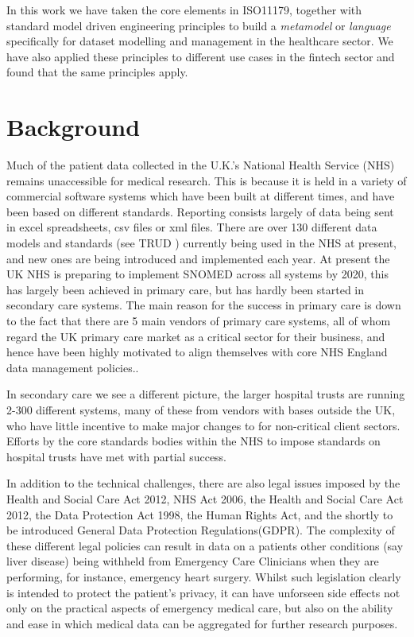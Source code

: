 \documentclass{llncs}
\begin{document}
	In this work we have taken the core elements in ISO11179, together with standard model driven engineering principles to build a \emph{metamodel} or \emph{language} specifically for dataset modelling and management in the healthcare sector. We have also applied these principles to different use cases in the fintech sector and found that the same principles apply.
	
	
	\section{Background}
	
	Much of the patient data collected in the U.K.'s National Health Service (NHS) remains unaccessible for medical research. This is because it is held in a variety of commercial software systems which have been built at different times, and have been based on different standards. Reporting consists largely of data being sent in excel spreadsheets, csv files or xml files.  There are over 130 different data models and standards (see TRUD \cite{TRUD2017}) currently being used in the NHS at present, and new ones are being introduced and implemented each year. At present the UK NHS is preparing to implement SNOMED across all systems by 2020, this has largely been achieved in primary care, but has hardly been started in secondary care systems. The main reason for the success in primary care is down to the fact that there are 5 main vendors of primary care systems, all of whom regard the UK primary care market as a critical sector for their business, and hence have been highly motivated to align themselves with core NHS England data management policies..  
	
	In secondary care we see a different picture, the larger hospital trusts are running 2-300 different systems, many of these from vendors with bases outside the UK, who have little incentive to make major changes to for non-critical client sectors. Efforts by the core standards bodies within the NHS to impose standards on hospital trusts have met with partial success. 
	
	In addition to the technical challenges, there are also legal issues imposed by the Health and Social Care Act 2012, NHS Act 2006, the Health and Social Care Act 2012, the Data Protection Act 1998, the Human Rights Act, and the shortly to be introduced General Data Protection Regulations(GDPR).  The complexity of these different legal policies can result in data on a patients other conditions (say liver disease) being withheld from Emergency Care Clinicians when they are performing, for instance, emergency heart surgery. Whilst such legislation clearly is intended to protect the patient's privacy, it can have unforseen side effects not only on the practical aspects of emergency medical care, but also on the ability and ease in which medical data can be aggregated for further research purposes.
	
\end{document}
